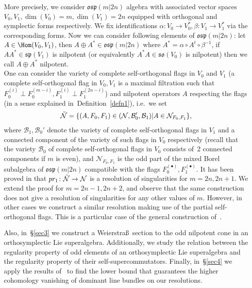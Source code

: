 \documentclass[12pt]{amsart}
\theoremstyle{definition}
\theoremstyle{remark}
\numberwithin{equation}{subsection}
\begin{document}
More precisely, we consider $\mathfrak{osp}(m|2n)$ algebra with associated vector spaces $V_0, V_1,\allowbreak \dim(V_0)=m, \dim(V_1)=2n$ equipped with orthogonal and symplectic forms respectively. We fix identifications $\alpha\colon  V_0 \rightarrow V_0^*, \beta\colon  V_1 \rightarrow V_1^*$ via the
corresponding forms. Now we can consider following elements of $\mathfrak{osp}(m|2n)$: let $A\in \Hom(V_0,V_1)$, then $A\oplus A^* \in \mathfrak{osp}(m|2n)$ where $A^* =\alpha \circ A^t \circ \beta^{-1}$, if $AA^* \in \mathfrak{sp}(V_1)$ is nilpotent (or equivalently $A^*A \in \mathfrak{so}(V_0)$ is nilpotent) then we call $A \oplus A^*$ nilpotent.\\
One can consider the variety of complete self-orthogonal flags in $V_0$ and $V_1$ (a complete self-orthogonal flag in $V_0,V_1$ is a maximal filtration such that $F_{0}^{(i)}\perp F_{0}^{(m-i)},F_{1}^{(i)}\perp F_{1}^{(2n-i)}$) and nilpotent operators $A$ respecting the flags
(in a sense explained in~Definition~\ref{defn1}), i.e.\ we set
\begin{equation}
    \Tilde{\mathcal{N}} = \{(A,F_0,F_1)\in (\mathcal{N}, \mathcal{B}_0',\mathcal{B}_1)| A\in \mathcal{N}_{F_0,F_1}\},
\end{equation}
where $\mathcal{B}_1,\mathcal{B}_0'$ denote the variety of complete self-orthogonal flags in $V_1$
and a connected component of the variety of such flags in $V_0$ respectively
(recall that the variety $\mathcal{B}_0$ of complete self-orthogonal flags in $V_0$
consists of~2 connected components if $m$ is
even), and $\mathcal{N}_{F_0,F_1}$ is the odd part of the mixed Borel subalgebra
of $\mathfrak{osp}(m|2n)$ compatible with the flags $F_0^{(\bullet)},F_1^{(\bullet)}$.
It has been proved in \cite{GL} that $pr_1\colon  \Tilde{\mathcal{N}} \rightarrow \mathcal{N}$ is a resolution of singularities for $m=2n,2n+1$. We extend the proof for $m=2n-1,2n+2$, and observe that
the same construction does not give a resolution of singularities for any other values of $m$. However, in other cases we construct a similar resolution making use of the partial
self-orthogonal flags. This is a particular case of the general construction of~\cite{HE}.

Also, in~\S\ref{sec3} we construct a Weierstra\ss\ section to the odd nilpotent cone in an
orthosymplectic Lie superalgebra. Additionally, we study the relation between the regularity property of
odd elements of an orthosymplectic Lie superalgebra and the regularity property of their
self-supercommutators. Finally, in~\S\ref{sec4} we apply the results of~\cite{DP} to find the
lower bound that guarantees the higher cohomology vanishing of dominant line bundles on our
resolutions.
\end{document}
